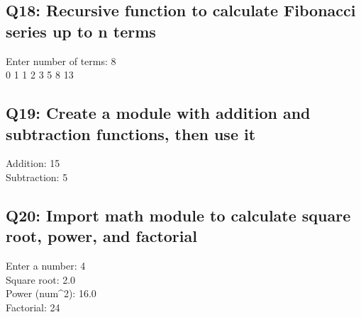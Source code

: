 \documentclass[11pt,a4paper]{article}
\begin{document}
\subsection{Q18: Recursive function to calculate Fibonacci series up to n terms}
\begin{outputbox}
Enter number of terms: 8\\
0 1 1 2 3 5 8 13
\end{outputbox}

\subsection{Q19: Create a module with addition and subtraction functions, then use it}
\begin{outputbox}
Addition: 15\\
Subtraction: 5
\end{outputbox}

\subsection{Q20: Import math module to calculate square root, power, and factorial}
\begin{outputbox}
Enter a number: 4\\
Square root: 2.0\\
Power (num\textasciicircum2): 16.0\\
Factorial: 24
\end{outputbox}
\end{document}
